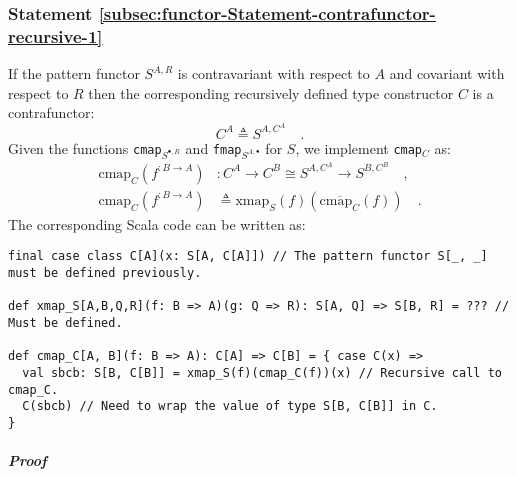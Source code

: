 \subsubsection{Statement \label{subsec:functor-Statement-contrafunctor-recursive-1}\ref{subsec:functor-Statement-contrafunctor-recursive-1}}

If the pattern functor $S^{A,R}$ is contravariant with respect to
$A$ and covariant with respect to $R$ then the corresponding recursively
defined type constructor $C$ is a contrafunctor:
\[
C^{A}\triangleq S^{A,C^{A}}\quad.
\]
Given the functions \lstinline!cmap!$_{S^{\bullet,R}}$ and \lstinline!fmap!$_{S^{A,\bullet}}$
for $S$, we implement \lstinline!cmap!$_{C}$ as:
\begin{align*}
\text{cmap}_{C}(f^{:B\rightarrow A}) & :C^{A}\rightarrow C^{B}\cong S^{A,C^{A}}\rightarrow S^{B,C^{B}}\quad,\\
\text{cmap}_{C}(f^{:B\rightarrow A}) & \triangleq\text{xmap}_{S}(f)(\overline{\text{cmap}_{C}}(f))\quad.
\end{align*}
The corresponding Scala code can be written as:
\begin{lstlisting}
final case class C[A](x: S[A, C[A]]) // The pattern functor S[_, _] must be defined previously.

def xmap_S[A,B,Q,R](f: B => A)(g: Q => R): S[A, Q] => S[B, R] = ??? // Must be defined.

def cmap_C[A, B](f: B => A): C[A] => C[B] = { case C(x) =>
  val sbcb: S[B, C[B]] = xmap_S(f)(cmap_C(f))(x) // Recursive call to cmap_C.
  C(sbcb) // Need to wrap the value of type S[B, C[B]] in C.
}
\end{lstlisting}


\subparagraph{Proof}

